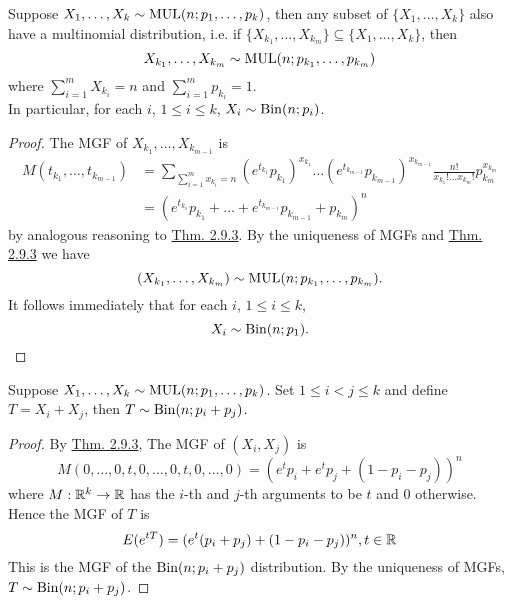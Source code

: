 \documentclass[11pt,fleqn]{book} %
\begin{document}
\begin{corollary} \label{cor:294}
Suppose \(X_1, \ldots, X_{k} \sim \operatorname{MUL}(n; p_1, \ldots, p_k)\), then any subset of \(\{X_1, \ldots, X_{k}\}\) also have a multinomial distribution, i.e. if \(\{X_{k_1}, \ldots, X_{k_m}\} \subseteq \{X_1, \ldots, X_{k}\}\), then
\[
X_{k_1}, \ldots, X_{k_m} \sim \operatorname{MUL}(n; p_{k_1}, \ldots, p_{k_m})
\]
where \(\sum_{i=1}^m X_{k_i} = n\) and \(\sum_{i=1}^m p_{k_i} = 1\). \\
\indent In particular, for each \(i\), \(1 \leq i \leq k\), \(X_i \sim \operatorname{Bin}(n; p_i)\).
\end{corollary}
\begin{proof} The MGF of \(X_{k_1}, \ldots, X_{k_{m-1}}\) is
\[
\begin{aligned}
M(t_{k_1}, \ldots, t_{k_{m-1}}) &= \sum_{\sum_{i=1}^m x_{k_i} = n} (e^{t_{k_1}}p_{k_1})^{x_{k_1}} \ldots (e^{t_{k_{m-1}}}p_{k_{m-1}})^{x_{k_{m-1}}} \frac{n!}{x_{k_1}! \ldots x_{k_m}!} p_{k_m}^{x_{k_m}} \\
&= (e^{t_{k_1}}p_{k_1} + \dots + e^{t_{k_{m-1}}}p_{k_{m-1}} + p_{k_m})^n
\end{aligned}
\]
by analogous reasoning to \hyperref[thm:293]{Thm. 2.9.3}. By the uniqueness of MGFs and \hyperref[thm:293]{Thm. 2.9.3} we have
\[
(X_{k_1}, \ldots, X_{k_m}) \sim \operatorname{MUL}(n; p_{k_1}, \ldots, p_{k_m}).
\]
\indent It follows immediately that for each \(i\), \(1 \leq i \leq k\),
\[
X_i \sim \operatorname{Bin}(n; p_1).
\]
\end{proof}

\begin{corollary} \label{cor:295}
Suppose \(X_1, \ldots, X_k \sim \operatorname{MUL}(n; p_1, \ldots, p_k)\). Set \(1 \leq i < j \leq k\) and define \(T = X_i + X_j\), then \(T \sim \operatorname{Bin}(n; p_i + p_j)\).
\end{corollary}
\begin{proof} By \hyperref[thm:293]{Thm. 2.9.3}, The MGF of \((X_i, X_j)\) is
\[
M(0, \ldots, 0, t, 0, \ldots, 0, t, 0, \ldots, 0) = (e^tp_i + e^tp_j + (1 - p_i - p_j))^n
\]
where \(M: \mathbb{R}^k \rightarrow \mathbb{R}\) has the \(i\)-th and \(j\)-th arguments to be \(t\) and 0 otherwise. Hence the MGF of \(T\) is
\[
E(e^{tT}) = (e^t(p_i + p_j) + (1 - p_i - p_j))^n, t \in \mathbb{R}
\]
\indent This is the MGF of the \(\operatorname{Bin}(n; p_i + p_j)\) distribution. By the uniqueness of MGFs, \(T \sim \operatorname{Bin}(n; p_i + p_j)\).
\end{proof}
\end{document}
